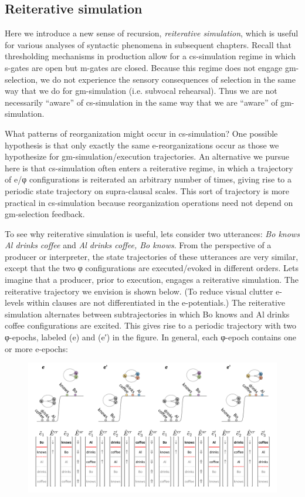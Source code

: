 \subsection{Reiterative simulation}

Here we introduce a new sense of recursion, \textit{reiterative simulation}, which is useful for various analyses of syntactic phenomena in subsequent chapters. Recall that thresholding mechanisms in production allow for a cs-simulation regime in which s-gates are open but m-gates are closed. Because this regime does not engage gm-selection, we do not experience the sensory consequences of selection in the same way that we do for gm-simulation (i.e. subvocal rehearsal). Thus we are not necessarily “aware” of cs-simulation in the same way that we are “aware” of gm-simulation.

  What patterns of reorganization might occur in cs-simulation? One possible hypothesis is that only exactly the same e-reorganizations occur as those we hypothesize for gm-simulation/execution trajectories. An alternative we pursue here is that cs-simulation often enters a reiterative regime, in which a trajectory of e/φ configurations is reiterated an arbitrary number of times, giving rise to a periodic state trajectory on supra-clausal scales. This sort of trajectory is more practical in cs-simulation because reorganization operations need not depend on gm-selection feedback.

  To see why reiterative simulation is useful, lets consider two utterances: \textit{Bo knows Al drinks coffee} and \textit{Al drinks coffee, Bo knows}. From the perspective of a producer or interpreter, the state trajectories of these utterances are very similar, except that the two φ configurations are executed/evoked in different orders. Lets imagine that a producer, prior to execution, engages a reiterative simulation. The reiterative trajectory we envision is shown below. (To reduce visual clutter e-levels within clauses are not differentiated in the e-potentials.) The reiterative simulation alternates between subtrajectories in which {\textbar}Bo knows{\textbar} and {\textbar}Al drinks coffee{\textbar} configurations are excited. This gives rise to a periodic trajectory with two φ-epochs,  labeled (e) and (e′) in the figure. In general, each φ-epoch contains one or more e-epochs:

  
\begin{figure}
\includegraphics[width=\textwidth]{figures/Tilsen-img115.png}
\caption{\missingcaption}
\label{fig:5:11}
\end{figure}
 

